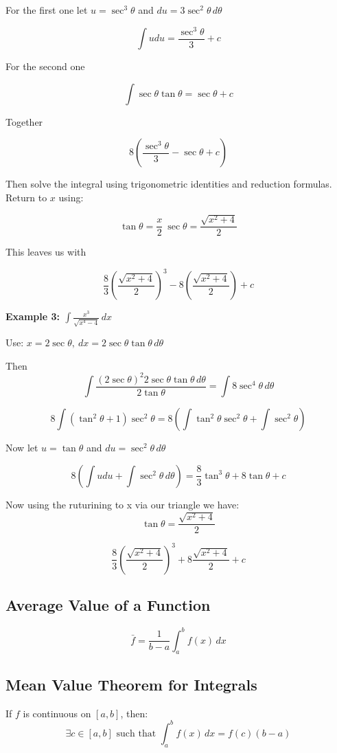 For the first one let \(u = \sec^3\theta\) and \(du = 3\sec^2\theta\,d\theta\) 

\[
\int udu = \frac{\sec^3\theta}{3} + c
\]

For the second one

\[
\int \sec\theta\tan\theta = \sec\theta + c
\]

Together

\[8\left(  \frac{\sec^3\theta}{3} - \sec\theta + c\right)\]

Then solve the integral using trigonometric identities and reduction formulas. Return to \( x \) using:

\[
\tan\theta = \frac{x}{2}\ \sec\theta = \frac{\sqrt{x^2 + 4}}{2}
\]

This leaves us with

\[
    \frac{8}{3} \left(\frac{\sqrt{x^2 + 4}}{2}\right)^3 - 8 \left( \frac{\sqrt{x^2 + 4}}{2}\right) + c
\]

\textbf{Example 3: \( \int \frac{x^3}{\sqrt{x^4 - 4}} \,dx \)}

Use: \(x = 2\sec \theta, \ dx = 2\sec \theta \tan \theta \,d\theta \)

Then
\[
\int \frac{(2\sec\theta)^2 2\sec\theta \tan\theta \,d\theta}{2\tan\theta} = \int 8\sec^4 \theta\,d\theta
\]

\[
8\int(\tan^2\theta + 1)\sec^2\theta = 8\left(\int\tan^2\theta\sec^2\theta + \int \sec^2\theta \right)
\]

Now let \(u = \tan\theta\) and \(du = \sec^2\theta \,d\theta\)

\[
8\left( \int udu  + \int \sec^2\theta\,d\theta\right) = 
\frac{8}{3}\tan^3\theta + 8\tan\theta + c
\]

Now using the ruturining to x via our triangle we have:
\[\tan\theta = \frac{\sqrt{x^2 + 4}}{2}\]

\[
\frac{8}{3}\left(\frac{\sqrt{x^2 + 4}}{2}\right)^3 + 8 \frac{\sqrt{x^2 + 4}}{2} + c
\]
\subsection{Average Value of a Function}

\[
\bar{f} = \frac{1}{b - a} \int_a^b f(x)\,dx
\]

\subsection{Mean Value Theorem for Integrals}

If \(f\) is continuous on \([a, b]\), then:
\[
\exists c \in [a, b] \text{ such that } \int_a^b f(x)\,dx = f(c)(b - a)
\]

